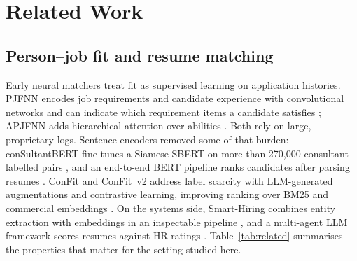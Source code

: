 \section{Related Work}\label{sec:related}
\subsection{Person--job fit and resume matching}
Early neural matchers treat fit as supervised learning on application histories. PJFNN encodes job
requirements and candidate experience with convolutional networks and can indicate which requirement
items a candidate satisfies \cite{zhu2018pjfnn}; APJFNN adds hierarchical attention over abilities
\cite{qin2018apjfnn}. Both rely on large, proprietary logs. Sentence encoders removed some of that
burden: conSultantBERT fine-tunes a Siamese SBERT on more than 270{,}000 consultant-labelled pairs
\cite{lavi2021consultantbert}, and an end-to-end BERT pipeline ranks candidates after parsing resumes
\cite{bhatia2019endtoend}. ConFit and ConFit~v2 address label scarcity with LLM-generated augmentations and
contrastive learning, improving ranking over BM25 and commercial embeddings
\cite{yu2024confit,yu2025confitv2}. On the systems side, Smart-Hiring combines entity extraction with
embeddings in an inspectable pipeline \cite{khelkhal2025smarthiring}, and a multi-agent LLM framework
scores resumes against HR ratings \cite{lo2025multiagent}.
Table~\ref{tab:related} summarises the properties that matter for the setting studied here.

